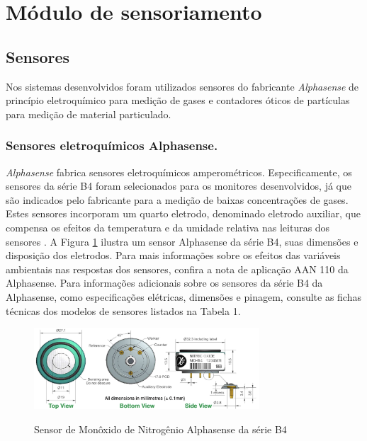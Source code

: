 \section{Módulo de sensoriamento}
\subsection{Sensores}

Nos sistemas desenvolvidos foram utilizados sensores do fabricante \textit{Alphasense} de princípio eletroquímico para medição de gases e contadores óticos de partículas para medição de material particulado.

\subsubsection{Sensores eletroquímicos Alphasense.}

\textit{Alphasense} fabrica sensores eletroquímicos amperométricos. Especificamente, os sensores da série B4 foram selecionados para os monitores desenvolvidos, já que são indicados pelo fabricante para a medição de baixas concentrações de gases. Estes sensores incorporam um quarto eletrodo, denominado eletrodo auxiliar, que compensa os efeitos da temperatura e da umidade relativa nas leituras dos sensores \cite{Baron2017AmperometricReview}. A Figura \ref{fig:alphasense-b4} ilustra um sensor Alphasense da série B4, suas dimensões e disposição dos eletrodos. Para mais informações sobre os efeitos das variáveis ambientais nas respostas dos sensores, confira a nota de aplicação AAN 110 da Alphasense. Para informações adicionais sobre os sensores da série B4 da Alphasense, como especificações elétricas, dimensões e pinagem, consulte as fichas técnicas dos modelos de sensores listados na Tabela 1.

\begin{figure}
    \centering
    \caption{Sensor de Monôxido de Nitrogênio Alphasense da série B4}
    \begin{center}
        \includegraphics[width=0.75\textwidth]{aftertext/Principais componentes de hardware/Figuras/Sensores serie B4.png}
    \label{fig:alphasense-b4}
    \end{center}
\end{figure}

